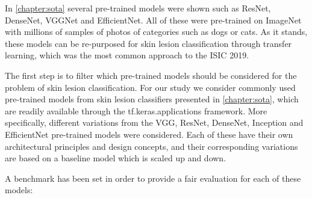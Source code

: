     In \ref{chapter:sota} several pre-trained models were shown such as ResNet, DenseNet, VGGNet and EfficientNet. All of these were pre-trained on ImageNet with millions of samples of photos of categories such as dogs or cats. As it stands, these models can be re-purposed for skin lesion classification through transfer learning, which was the most common approach to the ISIC 2019. \par
    The first step is to filter which pre-trained models should be considered for the problem of skin lesion classification. For our study we consider commonly used pre-trained models from skin lesion classifiers presented in \autoref{chapter:sota}, which are readily available through the tf.keras.applications framework. More specifically, different variations from the VGG, ResNet, DenseNet, Inception and EfficientNet pre-trained models were considered. Each of these have their own architectural principles and design concepts, and their corresponding variations are based on a baseline model which is scaled up and down. \par
    A benchmark has been set in order to provide a fair evaluation for each of these models:

